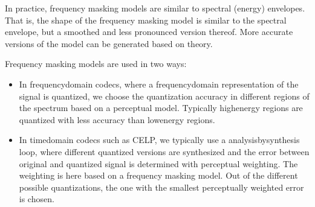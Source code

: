 \documentclass[letterpaper,10pt,english]{jupyterBook}
\begin{document}
\sphinxAtStartPar
In practice, frequency masking models are similar to spectral (energy)
envelopes. That is, the shape of the frequency masking model is similar
to the spectral envelope, but a smoothed and less pronounced version
thereof. More accurate versions of the model can be generated based on
 theory.

\sphinxAtStartPar
Frequency masking models are used in two ways:
\begin{itemize}
\item {} 
\sphinxAtStartPar
In frequency\sphinxhyphen{}domain codecs, where a frequency\sphinxhyphen{}domain representation
of the signal is quantized, we choose the quantization accuracy in
different regions of the spectrum based on a perceptual model.
Typically high\sphinxhyphen{}energy regions are quantized with less accuracy than
low\sphinxhyphen{}energy regions.

\item {} 
\sphinxAtStartPar
In time\sphinxhyphen{}domain codecs such as CELP, we typically use a
analysis\sphinxhyphen{}by\sphinxhyphen{}synthesis loop, where different quantized versions are
synthesized and the error between original and quantized signal is
determined with perceptual weighting. The weighting is here based on
a frequency masking model. Out of the different possible
quantizations, the one with the smallest perceptually weighted error
is chosen.

\end{itemize}
\end{document}
